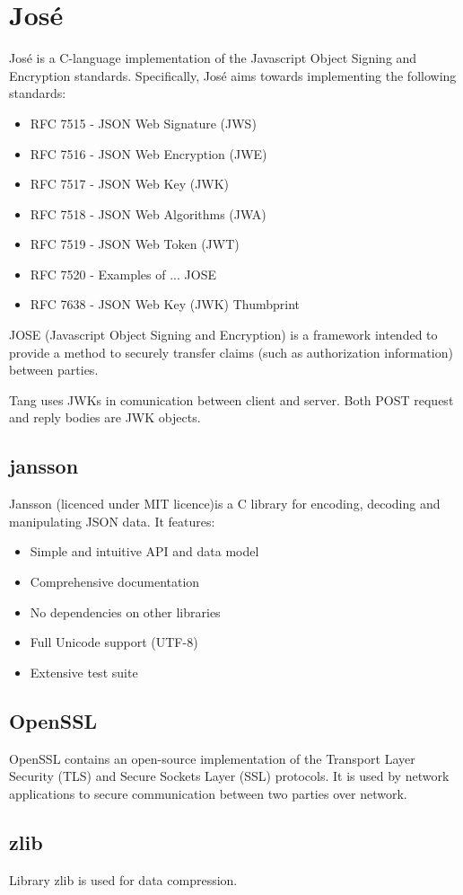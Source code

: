 \documentclass[../xdudla00-porting-Tang-to-Open-WRT.tex]{subfiles}
\begin{document}
\section{José}\label{jose}
José \cite{Jos} is a C-language implementation of the Javascript Object Signing and Encryption standards. Specifically, José aims towards implementing the following standards:
\begin{itemize}
   \item RFC 7515 - JSON Web Signature (JWS)        \cite{JWS}
   \item RFC 7516 - JSON Web Encryption (JWE)       \cite{JWE}
   \item RFC 7517 - JSON Web Key (JWK)              \cite{JWK}
   \item RFC 7518 - JSON Web Algorithms (JWA)       \cite{JWA}
   \item RFC 7519 - JSON Web Token (JWT)            \cite{JWT}
   \item RFC 7520 - Examples of ... JOSE            
   \item RFC 7638 - JSON Web Key (JWK) Thumbprint   \cite{JWK}
\end{itemize}

JOSE (Javascript Object Signing and Encryption) is a framework intended to provide a method to securely transfer claims (such as authorization information) between parties. 

Tang uses JWKs in comunication between client and server. Both POST request and reply bodies are JWK objects.

\subsection{jansson}\label{jansson}
Jansson \cite{jansson}(licenced under MIT licence)is a C library for encoding, decoding and manipulating JSON data. It features:
\begin{itemize}
   
    \item Simple and intuitive API and data model
    \item Comprehensive documentation
    \item No dependencies on other libraries
    \item Full Unicode support (UTF-8)
    \item Extensive test suite
\end{itemize}

\subsection{OpenSSL}\label{openssl}
OpenSSL \cite{openssl} contains an open-source implementation of the Transport Layer Security (TLS) and Secure Sockets Layer (SSL) protocols. It is used by network applications to secure communication between two parties over network.


\subsection{zlib}\label{zlib}
Library zlib \cite{zlib} is used for data compression.
\end{document}

